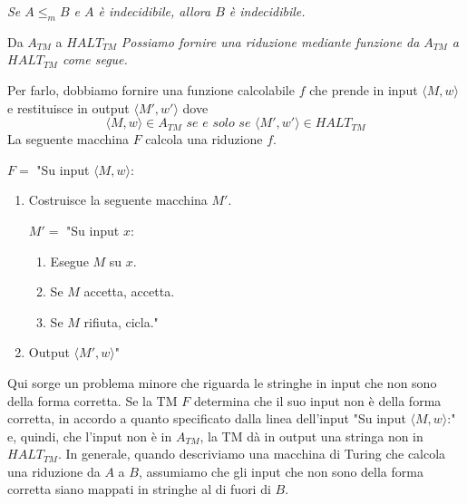 \begin{Corollario}{}{}
\textit{Se $A\leq_m B$ e $A$ è indecidibile, allora $B$ è indecidibile.}
\end{Corollario}

\begin{Example}{Da $A_{TM}$ a $HALT_{TM}$}{}
\textit{Possiamo fornire una riduzione mediante funzione da $A_{TM}$ a $HALT_{TM}$ come segue.}

Per farlo, dobbiamo fornire una funzione calcolabile $f$ che prende in input $\langle M, w\rangle$ e restituisce in output $\langle M', w'\rangle$ dove
\begin{equation*}
\langle M,w\rangle\in A_{TM} \textit{ se e solo se } \langle M', w'\rangle\in HALT_{TM}
\end{equation*}
La seguente macchina $F$ calcola una riduzione $f$.

$F=$ "Su input $\langle M, w\rangle$:
\begin{enumerate}
    \item Costruisce la seguente macchina $M'$.
    
    $M'=$ "Su input $x$:
    \begin{enumerate}
        \item Esegue $M$ su $x$.
        \item Se $M$ accetta, accetta.
        \item Se $M$ rifiuta, cicla."
    \end{enumerate}
    \item Output $\langle M', w\rangle$"
\end{enumerate}

Qui sorge un problema minore che riguarda le stringhe in input che non sono della forma corretta. Se la TM $F$ determina che il suo input non è della forma corretta, in accordo a quanto specificato dalla linea dell'input "Su input $\langle M, w\rangle$:" e, quindi, che l'input non è in $A_{TM}$, la TM dà in output una stringa non in $HALT_{TM}$. In generale, quando descriviamo una macchina di Turing che calcola una riduzione da $A$ a $B$, assumiamo che gli input che non sono della forma corretta siano mappati in stringhe al di fuori di $B$.
\end{Example}


